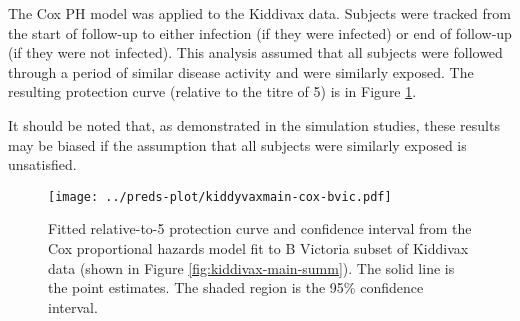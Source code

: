 The Cox PH model was applied to the Kiddivax data. Subjects were tracked from the start of follow-up to either infection (if they were infected) or end of follow-up (if they were not infected). This analysis assumed that all subjects were followed through a period of similar disease activity and were similarly exposed. The resulting protection curve (relative to the titre of 5) is in Figure \ref{fig:kiddyvaxmain-cox}.

It should be noted that, as demonstrated in the simulation studies, these results may be biased if the assumption that all subjects were similarly exposed is unsatisfied.

\begin{figure}[htp]
    \centering
    \texttt{[image: ../preds-plot/kiddyvaxmain-cox-bvic.pdf]}
    \caption{
        Fitted relative-to-5 protection curve and confidence interval from the Cox proportional hazards model fit to B Victoria subset of Kiddivax data (shown in Figure \ref{fig:kiddivax-main-summ}). The solid line is the point estimates. The shaded region is the 95\% confidence interval.
    }
    \label{fig:kiddyvaxmain-cox}
\end{figure}
